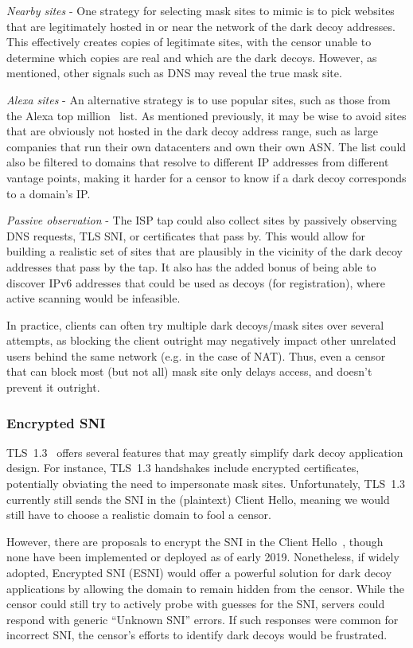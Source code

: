\documentclass[letterpaper,twocolumn,10pt]{article}
\begin{document}
\smallskip
\noindent
\emph{Nearby sites} - One strategy for selecting mask sites to mimic is to pick websites that are
legitimately hosted in or near the network of the dark decoy addresses. This
effectively creates copies of legitimate sites, with the censor unable to
determine which copies are real and which are the dark decoys. However, as
mentioned, other signals such as DNS may reveal the true mask site.

\smallskip
\noindent
\emph{Alexa sites} -
An alternative strategy is to use popular sites, such as those from the Alexa
top million~\cite{alexa} list. As mentioned previously, it may be wise to avoid
sites that are obviously not hosted in the dark decoy address range, such as
large companies that run their own datacenters and own their own ASN.
The list could also be filtered to domains that resolve to different IP
addresses from different vantage points, making it harder for a censor to know
if a dark decoy corresponds to a domain's IP.

\smallskip
\noindent
\emph{Passive observation} -
The ISP tap could also collect sites by passively observing DNS requests, TLS
SNI, or certificates that pass by. This would allow for building a realistic set
of sites that are plausibly in the vicinity of the dark decoy addresses
that pass by the tap. It also has the added bonus of being able to discover
IPv6 addresses that could be used as decoys (for registration), where active
scanning would be infeasible.

In practice, clients can often try multiple dark decoys/mask sites over
several attempts, as blocking the client outright may negatively impact other
unrelated users behind the same network (e.g. in the case of NAT). Thus, even a
censor that can block most (but not all) mask site only delays access, and
doesn't prevent it outright.

\subsubsection{Encrypted SNI}
\label{esni}

TLS~1.3~\cite{tls13} offers several features that may greatly simplify dark
decoy application design. For instance, TLS~1.3 handshakes include encrypted
certificates, potentially obviating the need to impersonate mask sites.
Unfortunately, TLS~1.3 currently still sends the SNI in the (plaintext) Client
Hello, meaning we would still have to choose a realistic domain to fool a
censor.

However, there are proposals to encrypt the SNI in the Client Hello~\cite{esni},
though none have been implemented or deployed as of early 2019. Nonetheless,
if widely adopted, Encrypted SNI (ESNI) would offer a powerful solution for dark
decoy applications by allowing the domain to remain hidden from the censor.
While the censor could still try to actively probe with guesses for the SNI,
servers could respond with generic ``Unknown SNI'' errors. If such responses
were common for incorrect SNI, the censor's efforts to identify dark decoys
would be frustrated.
\end{document}

